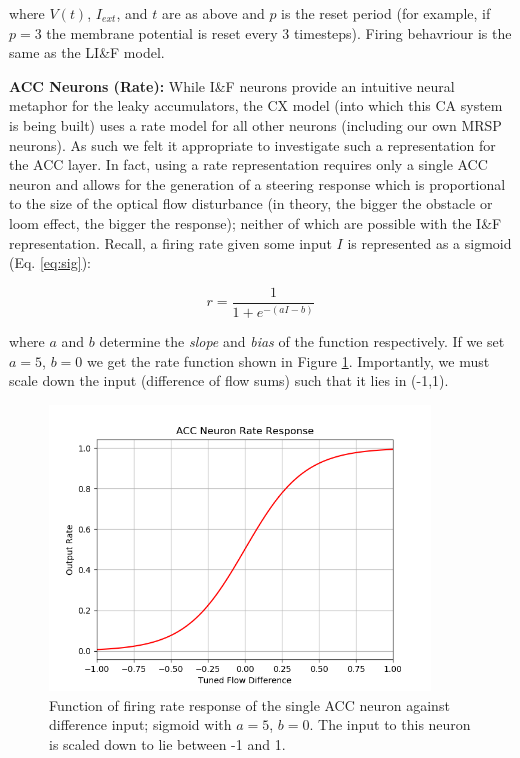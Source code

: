 \documentclass[a4paper,11pt,twoside,openright]{article}
\begin{document}
where $V(t)$, $I_{ext}$, and $t$ are as above and $p$ is the reset period (for
example, if $p = 3$ the membrane potential is reset every 3 timesteps). Firing
behavriour is the same as the LI\&F model.
\newline\par

\textbf{ACC Neurons (Rate):}
While I\&F neurons provide an intuitive neural metaphor for the leaky
accumulators, the CX model (into which this CA system is being built) uses
a rate model for all other neurons (including our own MRSP neurons). As such we
felt it appropriate to investigate such a representation for the ACC layer. In
fact, using a rate representation requires only a single ACC neuron and allows
for the generation of a steering response which is proportional to the size of
the optical flow disturbance (in theory, the bigger the obstacle or loom effect,
the bigger the response); neither of which are possible with the I\&F
representation. Recall, a firing rate given some input $I$ is represented as a
sigmoid (Eq. \ref{eq:sig}):

\begin{equation*}
r = \frac{1}{1 + e^{-(aI - b)}}
\end{equation*}

where $a$ and $b$ determine the \textit{slope} and \textit{bias} of the function
respectively. If we set $a = 5$, $b = 0$ we get the rate function shown in Figure
\ref{fig:accrate}. Importantly, we must scale down the input (difference of flow
sums) such that it lies in (-1,1).\newline\par

\begin{figure}[h!]
  \centering
  \includegraphics[width=0.9\textwidth]{ACCRate}
  \caption{\label{fig:accrate} Function of firing rate response of the single ACC
    neuron against difference input; sigmoid with $a = 5$, $b = 0$. The input to
  this neuron is scaled down to lie between -1 and 1.}
\end{figure}
\end{document}
